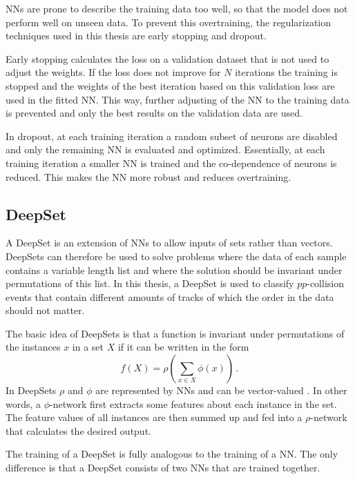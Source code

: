 NNs are prone to describe the training data too well, so that the model does not perform well on unseen data.
To prevent this overtraining, the regularization techniques used in this thesis are early stopping and dropout.

Early stopping calculates the loss on a validation dataset that is not used to adjust the weights.
If the loss does not improve for $N$ iterations the training is stopped and the weights of the best iteration based on this validation loss are used in the fitted NN.
This way, further adjusting of the NN to the training data is prevented and only the best results on the validation data are used.

In dropout, at each training iteration a random subset of neurons are disabled and only the remaining NN is evaluated and optimized.
Essentially, at each training iteration a smaller NN is trained and the co-dependence of neurons is reduced.
This makes the NN more robust and reduces overtraining.

\subsection{DeepSet}
\label{sec:DeepSet}

A DeepSet is an extension of NNs to allow inputs of sets rather than vectors.
DeepSets can therefore be used to solve problems where the data of each sample contains a variable length list and where the solution should be invariant under permutations of this list.
In this thesis, a DeepSet is used to classify $pp$-collision events that contain different amounts of tracks of which the order in the data should not matter.

The basic idea of DeepSets is that a function is invariant under permutations of the instances $x$ in a set $X$ if it can be written in the form 
\begin{equation*}
    f(X) = \rho \left( \sum_{x \in X} \phi (x) \right) \, .
\end{equation*}
In DeepSets $\rho$ and $\phi$ are represented by NNs and can be vector-valued \cite{deepset}.
In other words, a $\phi$-network first extracts some features about each instance in the set.
The feature values of all instances are then summed up and fed into a $\rho$-network that calculates the desired output.

The training of a DeepSet is fully analogous to the training of a NN.
The only difference is that a DeepSet consists of two NNs that are trained together.





